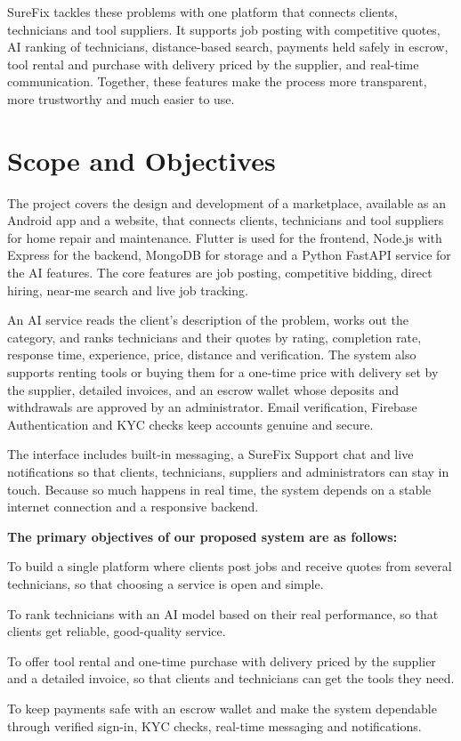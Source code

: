\documentclass[A4paper,12pt]{report}
\theoremstyle{plain}
\theoremstyle{definition}
\theoremstyle{remark}
\numberwithin{equation}{section}
\begin{document}
SureFix tackles these problems with one platform that connects clients, technicians and tool suppliers. It supports job posting with competitive quotes, AI ranking of technicians, distance-based search, payments held safely in escrow, tool rental and purchase with delivery priced by the supplier, and real-time communication. Together, these features make the process more transparent, more trustworthy and much easier to use.

\section{Scope and Objectives}
The project covers the design and development of a marketplace, available as an Android app and a website, that connects clients, technicians and tool suppliers for home repair and maintenance. Flutter is used for the frontend, Node.js with Express for the backend, MongoDB for storage and a Python FastAPI service for the AI features. The core features are job posting, competitive bidding, direct hiring, near-me search and live job tracking.

An AI service reads the client's description of the problem, works out the category, and ranks technicians and their quotes by rating, completion rate, response time, experience, price, distance and verification. The system also supports renting tools or buying them for a one-time price with delivery set by the supplier, detailed invoices, and an escrow wallet whose deposits and withdrawals are approved by an administrator. Email verification, Firebase Authentication and KYC checks keep accounts genuine and secure.

The interface includes built-in messaging, a SureFix Support chat and live notifications so that clients, technicians, suppliers and administrators can stay in touch. Because so much happens in real time, the system depends on a stable internet connection and a responsive backend.

\newlength{\desclabelwidth} 
\addtolength{\desclabelwidth}{\labelsep}
\textbf{The primary objectives of our proposed system are as follows:}
\begin{description}[noitemsep,nolistsep,leftmargin=1cm]
    \item[PO1] To build a single platform where clients post jobs and receive quotes from several technicians, so that choosing a service is open and simple.
    \item[PO2] To rank technicians with an AI model based on their real performance, so that clients get reliable, good-quality service.
        \item[PO3] To offer tool rental and one-time purchase with delivery priced by the supplier and a detailed invoice, so that clients and technicians can get the tools they need.
    \item [PO4] To keep payments safe with an escrow wallet and make the system dependable through verified sign-in, KYC checks, real-time messaging and notifications.
\end{description}
\end{document}
